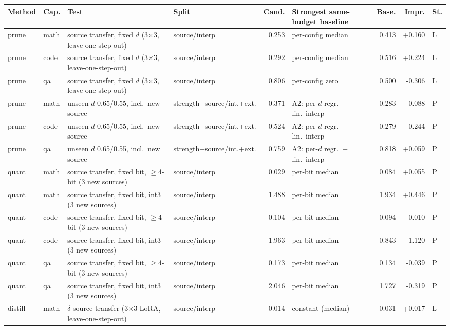 \begin{table}
\centering
\small
\setlength{\tabcolsep}{3pt}
\begin{tabular}{@{}llp{4.6cm}lrp{3.2cm}rrl@{}}
\toprule
Method & Cap. & Test & Split & Cand. & Strongest same-budget baseline & Base. & Impr. & St. \\
\midrule
prune & math & source transfer, fixed $d$ (3$\times$3, leave-one-step-out) & source/interp & 0.253 & per-config median & 0.413 & +0.160 & L \\
prune & code & source transfer, fixed $d$ (3$\times$3, leave-one-step-out) & source/interp & 0.292 & per-config median & 0.516 & +0.224 & L \\
prune & qa & source transfer, fixed $d$ (3$\times$3, leave-one-step-out) & source/interp & 0.806 & per-config zero & 0.500 & -0.306 & L \\
prune & math & unseen $d$ 0.65/0.55, incl.\ new source & strength+source/int.+ext. & 0.371 & A2: per-$d$ regr.\ + lin.\ interp & 0.283 & -0.088 & P \\
prune & code & unseen $d$ 0.65/0.55, incl.\ new source & strength+source/int.+ext. & 0.524 & A2: per-$d$ regr.\ + lin.\ interp & 0.279 & -0.244 & P \\
prune & qa & unseen $d$ 0.65/0.55, incl.\ new source & strength+source/int.+ext. & 0.759 & A2: per-$d$ regr.\ + lin.\ interp & 0.818 & +0.059 & P \\
\midrule
quant & math & source transfer, fixed bit, $\ge$4-bit (3 new sources) & source/interp & 0.029 & per-bit median & 0.084 & +0.055 & P \\
quant & math & source transfer, fixed bit, int3 (3 new sources) & source/interp & 1.488 & per-bit median & 1.934 & +0.446 & P \\
quant & code & source transfer, fixed bit, $\ge$4-bit (3 new sources) & source/interp & 0.104 & per-bit median & 0.094 & -0.010 & P \\
quant & code & source transfer, fixed bit, int3 (3 new sources) & source/interp & 1.963 & per-bit median & 0.843 & -1.120 & P \\
quant & qa & source transfer, fixed bit, $\ge$4-bit (3 new sources) & source/interp & 0.173 & per-bit median & 0.134 & -0.039 & P \\
quant & qa & source transfer, fixed bit, int3 (3 new sources) & source/interp & 2.046 & per-bit median & 1.727 & -0.319 & P \\
\midrule
distill & math & $\delta$ source transfer (3$\times$3 LoRA, leave-one-step-out) & source/interp & 0.014 & constant (median) & 0.031 & +0.017 & L \\

\end{tabular}
\end{table}
